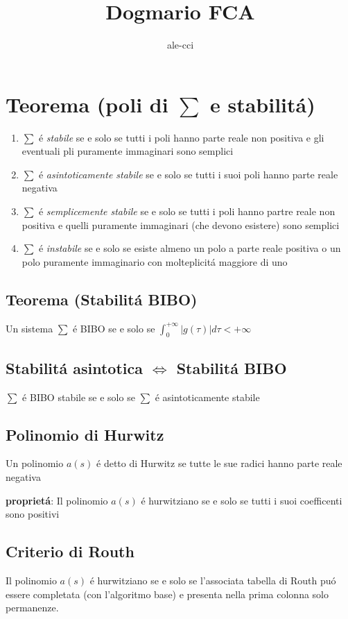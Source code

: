 \documentclass{article}
\title{Dogmario FCA}
\author{ale-cci}
\begin{document}
\section{Teorema (poli di $\sum$ e stabilit\'a)}
\begin{enumerate}
    \item $\sum$ \'e \textit{stabile} se e solo se tutti i poli hanno parte reale non positiva e gli eventuali pli puramente immaginari sono semplici
    \item $\sum$ \'e \textit{asintoticamente stabile} se e solo se tutti i suoi poli hanno parte reale negativa
    \item $\sum$ \'e \textit{semplicemente stabile} se e solo se tutti i poli hanno partre reale non positiva e quelli puramente immaginari (che devono esistere) sono semplici
    \item $\sum$ \'e \textit{instabile} se e solo se esiste almeno un polo a parte reale positiva o un polo puramente immaginario con molteplicit\'a maggiore di uno
\end{enumerate}
\subsection{Teorema (Stabilit\'a BIBO)}
Un sistema $\sum$ \'e BIBO se e solo se $\int_0^{+\infty} | g(\tau) | d\tau < + \infty$


\subsection{Stabilit\'a asintotica $\Leftrightarrow$ Stabilit\'a BIBO}
$\sum$ \'e BIBO stabile se e solo se $\sum$ \'e asintoticamente stabile

\subsection{Polinomio di Hurwitz}
Un polinomio $a(s)$ \'e detto di Hurwitz se tutte le sue radici hanno parte reale negativa

\textbf{propriet\'a}: Il polinomio $a(s)$ \'e hurwitziano se e solo se tutti i suoi coefficenti sono positivi

\subsection{Criterio di Routh}
Il polinomio $a(s)$ \'e hurwitziano se e solo se l'associata tabella di Routh pu\'o essere completata (con l'algoritmo base) e presenta nella prima colonna solo permanenze.
\end{document}
